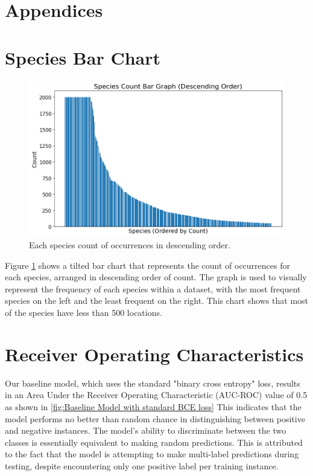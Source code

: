 \documentclass{article}
\begin{document}
\newpage



\newpage

\appendix
\section*{\Large Appendices}
\section{Species Bar Chart}


\begin{figure}[H]
    \centering
    \includegraphics[width=1\linewidth]{speciesbarchart.png}
    \caption{Each species count of occurrences in descending order.}
    \label{fig:speciesbarchart}
\end{figure}

Figure \ref{fig:speciesbarchart} shows a tilted bar chart that represents the count of occurrences for each species, arranged in descending order of count. The graph is used to visually represent the frequency of each species within a dataset, with the most frequent species on the left and the least frequent on the right. This chart shows that most of the species have less than 500 locations. 



\section{Receiver Operating Characteristics}

Our baseline model, which uses the standard "binary cross entropy" loss, results in an Area Under the Receiver Operating Characteristic (AUC-ROC) value of 0.5 as shown in \ref{fig:Baseline Model with standard BCE loss} This indicates that the model performs no better than random chance in distinguishing between positive and negative instances. The model's ability to discriminate between the two classes is essentially equivalent to making random predictions. This is attributed to the fact that the model is attempting to make multi-label predictions during testing, despite encountering only one positive label per training instance.
\end{document}
